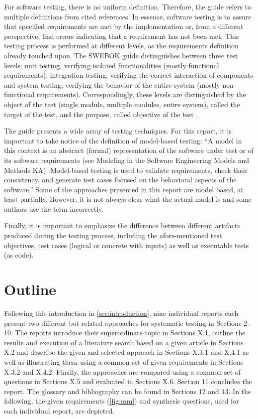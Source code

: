 For software testing, there is no uniform definition.
Therefore, the guide refers to multiple definitions from cited references.
In essence, software testing is to assure that specified requirements are met by the implementation or, from a different perspective, find errors indicating that a requirement has not been met.
This testing process is performed at different levels, as the requirements definition already touched upon. %
The SWEBOK guide distinguishes between three test levels: unit testing, verifying isolated functionalities (mostly functional requirements), integration testing, verifying the correct interaction of components and system testing, verifying the behavior of the entire system (mostly non-functional requirements).
Correspondingly, these levels are distinguished by the object of the test (single module, multiple modules, entire system), called the target of the test, and the purpose, called objective of the test \cite{SWEBOK}.

The guide presents a wide array of testing techniques.
For this report, it is important to take notice of the definition of model-based testing: \enquote{A model in this context is an abstract (formal) representation of the software under test or of its software requirements (see Modeling in the Software Engineering Models and Methods KA).
Model-based testing is used to validate requirements, check their consistency, and generate test cases focused on the behavioral aspects of the software.}\cite{SWEBOK}
Some of the approaches presented in this report are model based, at least partially.
However, it is not always clear what the actual model is and some authors use the term incorrectly.

Finally, it is important to emphasize the difference between different artifacts produced during the testing process, including the afore-mentioned test objectives, test cases (logical or concrete with inputs) as well as executable tests (as code).

\section{Outline}

Following this introduction in \autoref{sec:introduction}, nine individual reports each present two different but related approaches for systematic testing in Sections 2\,-\,10.
The reports introduce their superordinate topic in Sections X.1, outline the results and execution of a literature search based on a given article in Sections X.2 and describe the given and selected approach in Sections X.3.1 and X.4.1 as well as illustrating them using a common set of given requirements in Sections X.3.2 and X.4.2.
Finally, the approaches are compared using a common set of questions in Sections X.5 and evaluated in Sections X.6.
Section 11 concludes the report.
The glossary and bibliography can be found in Sections 12 and 13.
In the following, the given requirements (\autoref{fig:mm}) and synthesis questions, used for each individual report, are depicted.

